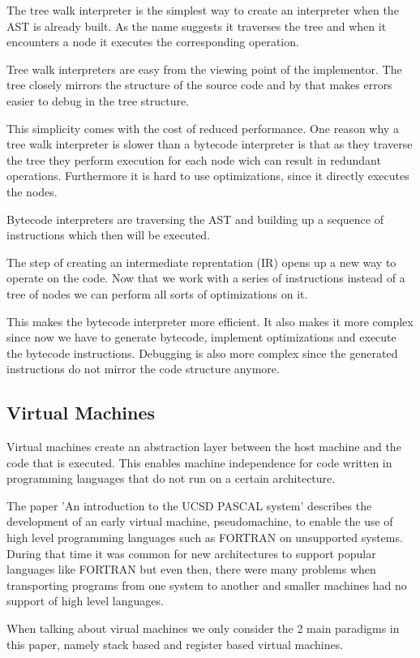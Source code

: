 \documentclass{article}
\begin{document}
The tree walk interpreter is the simplest way to create an interpreter when the
AST is already built. As the name suggests it traverses the tree and when it
encounters a node it executes the corresponding operation.

Tree walk interpreters are easy from the viewing point of the implementor. The
tree closely mirrors the structure of the source code and by that makes errors
easier to debug in the tree structure.

This simplicity comes with the cost of reduced performance. One reason why a
tree walk interpreter is slower than a bytecode interpreter is that as they
traverse the tree they perform execution for each node wich can result in
redundant operations. Furthermore it is hard to use optimizations, since
it directly executes the nodes.

Bytecode interpreters are traversing the AST and building up a sequence of 
instructions which then will be executed. 

The step of creating an intermediate reprentation (IR) opens up a new way to
operate on the code. Now that we work with a series of instructions instead of
a tree of nodes we can perform all sorts of optimizations on it.

This makes the bytecode interpreter more efficient. It also makes it more
complex since now we have to generate bytecode, implement optimizations
and execute the bytecode instructions. Debugging is also more complex since
the generated instructions do not mirror the code structure anymore.

\subsection{Virtual Machines}
Virtual machines create an abstraction layer between the host machine and 
the code that is executed. This enables machine independence for code
written in programming languages that do not run on a certain architecture.

The paper 'An introduction to the UCSD PASCAL system' describes the development
of an early virtual machine, pseudomachine, to enable the use of high level
programming languages such as FORTRAN on unsupported systems. During that time
it was common for new architectures to support popular languages like FORTRAN
but even then, there were many problems when transporting programs from one
system to another and smaller machines had no support of high level languages.
~\cite{pascal}

When talking about virual machines we only consider the 2 main paradigms in
this paper, namely stack based and register based virtual machines.
\end{document}
